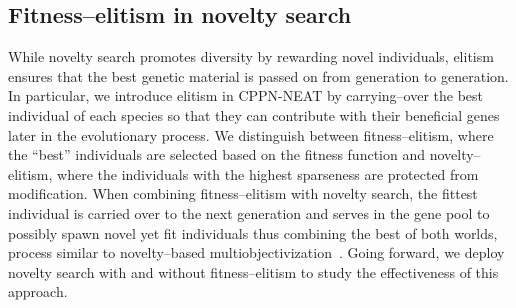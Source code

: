 \documentclass{sig-alternate}
\begin{document}
\subsection{Fitness--elitism in novelty search}
While novelty search promotes diversity by rewarding novel individuals, elitism ensures that the best genetic material is passed on from generation to generation.
In particular, we introduce elitism in CPPN-NEAT by carrying--over the best individual of each species so that they can contribute with their beneficial genes later in the evolutionary process. We distinguish between fitness--elitism, where the ``best'' individuals are selected based on the fitness function and novelty--elitism, where the individuals with the highest sparseness are protected from modification. When combining fitness--elitism with novelty search, the fittest individual is carried over to the next generation and serves in the gene pool to possibly spawn novel yet fit individuals thus combining the best of both worlds, process similar to novelty--based multiobjectivization~\cite{mouret2011novelty}. Going forward, we deploy novelty search with and without fitness--elitism to study the effectiveness of this approach.

\end{document}
